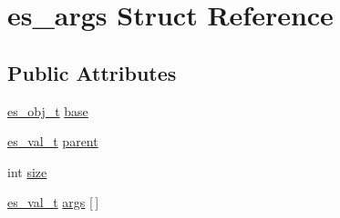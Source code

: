 \hypertarget{structes__args}{\section{es\-\_\-args Struct Reference}
\label{structes__args}
}
\subsection*{Public Attributes}
\begin{DoxyCompactItemize}
\item 
\hyperlink{eva_8h_a3370a89a85f5ff467ca5e7dba47e63bc}{es\-\_\-obj\-\_\-t} \hyperlink{structes__args_a07f1719a134aed2ce51c9b38e1295efe}{base}
\item 
\hyperlink{eva_8h_a31286b308f3660f383b567314be88045}{es\-\_\-val\-\_\-t} \hyperlink{structes__args_acefc4ac9da7592e3067f7def315177d7}{parent}
\item 
int \hyperlink{structes__args_a75f7fc453b304c39c11cb2f8518acce5}{size}
\item 
\hyperlink{eva_8h_a31286b308f3660f383b567314be88045}{es\-\_\-val\-\_\-t} \hyperlink{structes__args_ab00fbef88ba6cd8f02a3a0a0804b948b}{args} \mbox{[}$\,$\mbox{]}
\end{DoxyCompactItemize}


